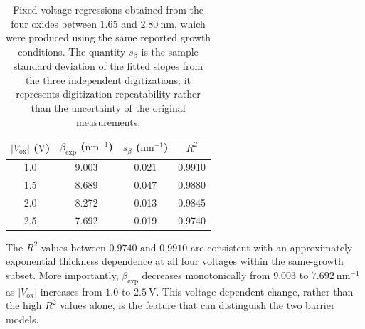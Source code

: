 \documentclass[12pt]{article}
\begin{document}
\begin{table}[H]
    \begin{singlespace}
        \centering
        \caption{Fixed-voltage regressions obtained from the four oxides between \(1.65\) and \(2.80~\mathrm{nm}\), which were produced using the same reported growth conditions. The quantity \(s_{\beta}\) is the sample standard deviation of the fitted slopes from the three independent digitizations; it represents digitization repeatability rather than the uncertainty of the original measurements.}
        \label{tab:khairurrijal-fixed-voltage-fits}
        \begin{tabular}{cccc}
            \toprule
            \(\lvert V_{\mathrm{ox}}\rvert\) (\(\mathrm{V}\))
            & \(\beta_{\mathrm{exp}}\) (\(\mathrm{nm^{-1}}\))
            & \(s_{\beta}\) (\(\mathrm{nm^{-1}}\))
            & \(R^2\) \\
            \midrule
            1.0 & 9.003 & 0.021 & 0.9910 \\
            1.5 & 8.689 & 0.047 & 0.9880 \\
            2.0 & 8.272 & 0.013 & 0.9845 \\
            2.5 & 7.692 & 0.019 & 0.9740 \\
            \bottomrule
        \end{tabular}
    \end{singlespace}
\end{table}

The \(R^2\) values between \(0.9740\) and \(0.9910\) are consistent with an approximately exponential thickness dependence at all four voltages within the same-growth subset. More importantly, \(\beta_{\mathrm{exp}}\) decreases monotonically from \(9.003\) to \(7.692~\mathrm{nm^{-1}}\) as \(\lvert V_{\mathrm{ox}}\rvert\) increases from \(1.0\) to \(2.5~\mathrm{V}\). This voltage-dependent change, rather than the high \(R^2\) values alone, is the feature that can distinguish the two barrier models.
\end{document}
